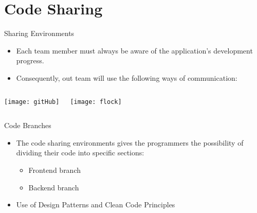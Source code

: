 \documentclass{beamer}
\begin{document}

\section{Code Sharing}



\begin{frame}{Sharing Environments}
	
	\begin{itemize}
		\item Each team member must always be aware of the application's development progress.
		\item Consequently, out team will use the following ways of communication:
	\end{itemize}


\begin{columns}
	\centering
	 \texttt{[image: gitHub]}
	
	\centering
	\texttt{[image: flock]}
\end{columns}
	
	
\end{frame}


\begin{frame}{Code Branches}
	
	\begin{itemize}
		\item The code sharing environments gives the programmers the possibility of dividing their code into specific sections:
		\begin{itemize}
			\item Frontend branch
			\item Backend branch
		\end{itemize}
		\item Use of Design Patterns and Clean Code Principles
	\end{itemize}
	
\end{frame}

\end{document}
